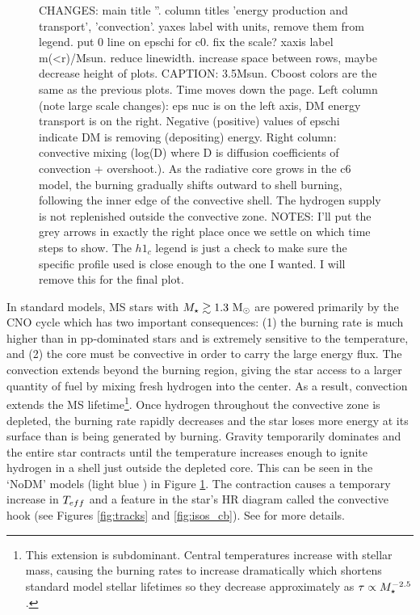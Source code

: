 \documentclass[useAMS,usenatbib]{mnras}
\begin{document}
\begin{figure}
    \caption{
    CHANGES: main title ''. column titles 'energy production and transport', 'convection'. yaxes label with units, remove them from legend. put 0 line on epschi for c0. fix the scale? xaxis label m(<r)/Msun. reduce linewidth. increase space between rows, maybe decrease height of plots.
    CAPTION: 3.5Msun. Cboost colors are the same as the previous plots. Time moves down the page. Left column (note large scale changes): eps nuc is on the left axis, DM energy transport is on the right. Negative (positive) values of epschi indicate DM is removing (depositing) energy. Right column: convective mixing (log(D) where D is diffusion coefficients of convection + overshoot.). As the radiative core grows in the c6 model, the burning gradually shifts outward to shell burning, following the inner edge of the convective shell. The hydrogen supply is not replenished outside the convective zone. NOTES: I'll put the grey arrows in exactly the right place once we settle on which time steps to show. The $h1_c$ legend is just a check to make sure the specific profile used is close enough to the one I wanted. I will remove this for the final plot.}
    \label{fig:m3p5}
  \end{figure}

  In standard models, MS stars with $M_{\star} \gtrsim 1.3 \ \mathrm{M}_{\odot}$ are powered primarily by the CNO cycle which has two important consequences: (1) the burning rate is much higher than in pp-dominated stars and is extremely sensitive to the temperature, and (2) the core must be convective in order to carry the large energy flux. The convection extends beyond the burning region, giving the star access to a larger quantity of fuel by mixing fresh hydrogen into the center. As a result, convection extends the MS lifetime\footnote{This extension is subdominant. Central temperatures increase with stellar mass, causing the burning rates to increase dramatically which shortens standard model stellar lifetimes so they decrease approximately as $\tau \propto M_{\star}^{-2.5}$.}. Once hydrogen throughout the convective zone is depleted, the burning rate rapidly decreases and the star loses more energy at its surface than is being generated by burning. Gravity temporarily dominates and the entire star contracts until the temperature increases enough to ignite hydrogen in a shell just outside the depleted core. This can be seen in the `NoDM' models (light blue ) in Figure \ref{fig:m3p5}.  The contraction causes a temporary increase in
  $T_{eff}$ and a feature in the star's HR diagram called the convective hook (see Figures \ref{fig:tracks} and \ref{fig:isos_cb}). See \citet{Pols1990StellarEvolution} for more details.
\end{document}
